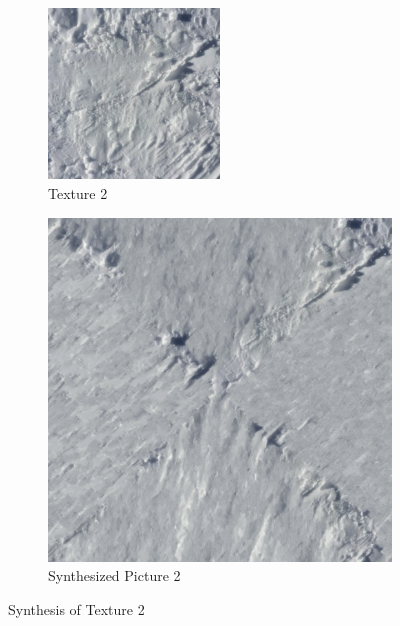 \documentclass{article}
\begin{document}
\begin{figure}[htbp!]
    \centering
    \begin{subfigure}[b]{0.49\textwidth}
        \centering
        \includegraphics[width=0.5\textwidth]{../Code/Textures/2.png}
        \caption{Texture 2}
        \label{fig:original-2}
    \end{subfigure}
    \hfill %
    \begin{subfigure}[b]{0.49\textwidth}
        \centering
        \includegraphics[width=\textwidth]{../Result/2.png}
        \caption{Synthesized Picture 2}
        \label{fig:synthesized-2}
    \end{subfigure}
    \caption{Synthesis of Texture 2}
    \label{fig:synthesis-2}
\end{figure}
\end{document}
